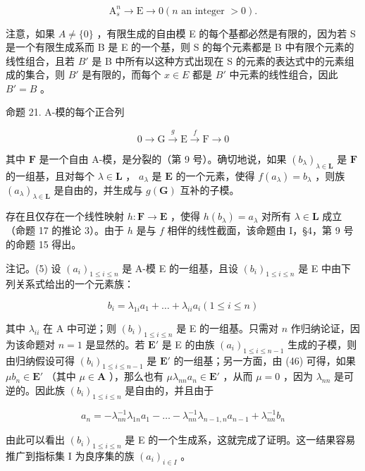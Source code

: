 \[
\mathrm{A} _ {s} ^ {n} \rightarrow \mathrm{E} \rightarrow 0 (n \text {   an   integer   } > 0).
\]

注意，如果 \(A \neq \{0\}\) ，有限生成的自由模 E 的每个基都必然是有限的，因为若 S 是一个有限生成系而 B 是 E 的一个基，则 S 的每个元素都是 B 中有限个元素的线性组合，且若 \(B'\) 是 B 中所有以这种方式出现在 S 的元素的表达式中的元素组成的集合，则 \(B'\) 是有限的，而每个 \(x \in E\) 都是 \(B'\) 中元素的线性组合，因此 \(B' = B\) 。

命题 21. A-模的每个正合列

\[
0 \longrightarrow \mathrm{G} \stackrel {g} {\longrightarrow} \mathrm{E} \stackrel {f} {\longrightarrow} \mathrm{F} \longrightarrow 0
\]

其中 \(\mathbf{F}\) 是一个自由 A-模，是分裂的（第 9 号）。确切地说，如果 \((b_{\lambda})_{\lambda \in \mathbf{L}}\) 是 \(\mathbf{F}\) 的一组基，且对每个 \(\lambda \in \mathbf{L}\) ， \(a_{\lambda}\) 是 \(\mathbf{E}\) 的一个元素，使得 \(f(a_{\lambda}) = b_{\lambda}\) ，则族 \((a_{\lambda})_{\lambda \in \mathbf{L}}\) 是自由的，并生成与 \(g(\mathbf{G})\) 互补的子模。

存在且仅存在一个线性映射 \(h: \mathbf{F} \to \mathbf{E}\) ，使得 \(h(b_{\lambda}) = a_{\lambda}\) 对所有 \(\lambda \in \mathbf{L}\) 成立（命题 17 的推论 3）。由于 \(h\) 是与 \(f\) 相伴的线性截面，该命题由 I，§4，第 9 号的命题 15 得出。

注记。(5) 设 \((a_{i})_{1\leqslant i\leqslant n}\) 是 A-模 E 的一组基，且设 \((b_{i})_{1\leqslant i\leqslant n}\) 是 E 中由下列关系式给出的一个元素族：

\[
b _ {i} = \lambda_ {1 i} a _ {1} + \dots + \lambda_ {i i} a _ {i} (1 \leqslant i \leqslant n)\tag{46}
\]

其中 \(\lambda_{ii}\) 在 A 中可逆；则 \((b_i)_{1\leqslant i\leqslant n}\) 是 E 的一组基。只需对 \(n\) 作归纳论证，因为该命题对 \(n = 1\) 是显然的。若 \(\mathbf{E}'\) 是 E 的由族 \((a_i)_{1\leqslant i\leqslant n - 1}\) 生成的子模，则由归纳假设可得 \((b_i)_{1\leqslant i\leqslant n - 1}\) 是 \(\mathbf{E}'\) 的一组基；另一方面，由 (46) 可得，如果 \(\mu b_n\in \mathbf{E}'\) （其中 \(\mu \in \mathbf{A}\) ），那么也有 \(\mu \lambda_{nn}a_n\in \mathbf{E}'\) ，从而 \(\mu = 0\) ，因为 \(\lambda_{nn}\) 是可逆的。因此族 \((b_i)_{1\leqslant i\leqslant n}\) 是自由的，并且由于

\[
a _ {n} = - \lambda_ {n n} ^ {- 1} \lambda_ {1 n} a _ {1} - \dots - \lambda_ {n n} ^ {- 1} \lambda_ {n - 1, n} a _ {n - 1} + \lambda_ {n n} ^ {- 1} b _ {n}
\]

由此可以看出 \((b_{i})_{1\leqslant i\leqslant n}\) 是 E 的一个生成系，这就完成了证明。这一结果容易推广到指标集 I 为良序集的族 \((a_{i})_{i\in I}\) 。
\relax{}
